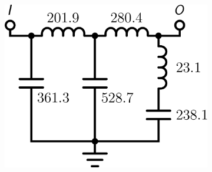 \begin{figure}[h!]
\begin{subfigure}[t]{0.25\textwidth}
\includegraphics[scale = 0.14]{../ch6/figures/lpf3_circuit3}
\caption{}
\end{subfigure}%


\end{figure}
